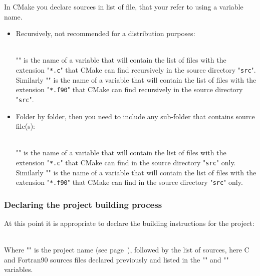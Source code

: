 In CMake you declare sources in list of file, that your refer to using a variable name.
\begin{itemize}
\item Recursively, not recommended for a distribution purposes:
{\footnotesize{
\begin{scripti}
\end{scripti}
}} \\[-0.5cm]
\noindent "" is the name of a variable that will contain the list of files with the extension "\texttt{*.c}" that CMake can find recursively in the source directory "\texttt{src}". \\
Similarly "" is the name of a variable that will contain the list of files with the extension "\texttt{*.f90}" that CMake can find recursively in the source directory "\texttt{src}".
\item Folder by folder, then you need to include any sub-folder that contains source file(s):
{\footnotesize{
\begin{scripti}
\end{scripti}
}} \\[-0.5cm]
\noindent "" is the name of a variable that will contain the list of files with the extension "\texttt{*.c}" that CMake can find in the source directory "\texttt{src}" only. \\
Similarly "" is the name of a variable that will contain the list of files with the extension "\texttt{*.f90}" that CMake can find in the source directory "\texttt{src}" only. 
\end{itemize}

\subsubsection*{Declaring the project building process}

At this point it is appropriate to declare the building instructions for the project: 
\begin{script}
\end{script}
\\[-0.25cm]
\noindent Where "" is the project name (see page~\pageref{cmake_pname}), followed by the list of sources, here C and Fortran90 sources files declared previously and listed in the "" and "" variables. 

